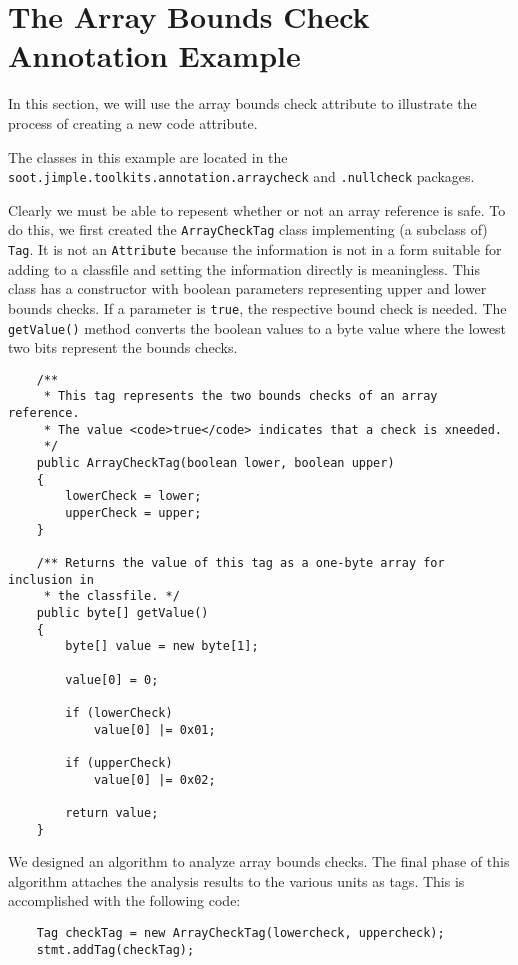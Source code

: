 \documentclass{article}
\begin{document}
\section{The Array Bounds Check Annotation Example}

In this section, we will use the array bounds check attribute to 
illustrate the process of creating a new code attribute.

The classes in this example are located in the {\tt
soot.jimple.toolkits.annotation.arraycheck} and {\tt .nullcheck} packages.

Clearly we must be able to repesent whether or not an array reference
is safe.  To do this, we first created the {\tt ArrayCheckTag} class
implementing (a subclass of) {\tt Tag}.  It is not an {\tt Attribute}
because the information is not in a form suitable for adding to a 
classfile and setting the information directly is meaningless.  
This class has a constructor
with boolean parameters representing upper and lower bounds checks. If
a parameter is {\tt true}, the respective bound check is needed. The
{\tt getValue()} method converts the boolean values to a byte value
where the lowest two bits represent the bounds checks.

\begin{verbatim}
    /** 
     * This tag represents the two bounds checks of an array reference.
     * The value <code>true</code> indicates that a check is xneeded.
     */
    public ArrayCheckTag(boolean lower, boolean upper)
    {
        lowerCheck = lower;
        upperCheck = upper;
    }

    /** Returns the value of this tag as a one-byte array for inclusion in
     * the classfile. */
    public byte[] getValue()
    {
        byte[] value = new byte[1];

        value[0] = 0;
        
        if (lowerCheck)
            value[0] |= 0x01;
        
        if (upperCheck)
            value[0] |= 0x02;

        return value;
    }
\end{verbatim}

We designed an algorithm to analyze array bounds checks. The final
phase of this algorithm attaches the analysis results to the various
units as tags. This is accomplished with the following code:
\begin{verbatim}
    Tag checkTag = new ArrayCheckTag(lowercheck, uppercheck);
    stmt.addTag(checkTag);
\end{verbatim}
\end{document}
